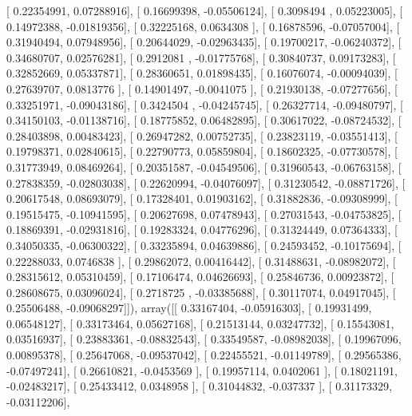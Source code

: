 \documentclass{article}
\begin{document}
       [ 0.22354991,  0.07288916],
       [ 0.16699398, -0.05506124],
       [ 0.3098494 ,  0.05223005],
       [ 0.14972388, -0.01819356],
       [ 0.32225168,  0.0634308 ],
       [ 0.16878596, -0.07057004],
       [ 0.31940494,  0.07948956],
       [ 0.20644029, -0.02963435],
       [ 0.19700217, -0.06240372],
       [ 0.34680707,  0.02576281],
       [ 0.2912081 , -0.01775768],
       [ 0.30840737,  0.09173283],
       [ 0.32852669,  0.05337871],
       [ 0.28360651,  0.01898435],
       [ 0.16076074, -0.00094039],
       [ 0.27639707,  0.0813776 ],
       [ 0.14901497, -0.0041075 ],
       [ 0.21930138, -0.07277656],
       [ 0.33251971, -0.09043186],
       [ 0.3424504 , -0.04245745],
       [ 0.26327714, -0.09480797],
       [ 0.34150103, -0.01138716],
       [ 0.18775852,  0.06482895],
       [ 0.30617022, -0.08724532],
       [ 0.28403898,  0.00483423],
       [ 0.26947282,  0.00752735],
       [ 0.23823119, -0.03551413],
       [ 0.19798371,  0.02840615],
       [ 0.22790773,  0.05859804],
       [ 0.18602325, -0.07730578],
       [ 0.31773949,  0.08469264],
       [ 0.20351587, -0.04549506],
       [ 0.31960543, -0.06763158],
       [ 0.27838359, -0.02803038],
       [ 0.22620994, -0.04076097],
       [ 0.31230542, -0.08871726],
       [ 0.20617548,  0.08693079],
       [ 0.17328401,  0.01903162],
       [ 0.31882836, -0.09308999],
       [ 0.19515475, -0.10941595],
       [ 0.20627698,  0.07478943],
       [ 0.27031543, -0.04753825],
       [ 0.18869391, -0.02931816],
       [ 0.19283324,  0.04776296],
       [ 0.31324449,  0.07364333],
       [ 0.34050335, -0.06300322],
       [ 0.33235894,  0.04639886],
       [ 0.24593452, -0.10175694],
       [ 0.22288033,  0.0746838 ],
       [ 0.29862072,  0.00416442],
       [ 0.31488631, -0.08982072],
       [ 0.28315612,  0.05310459],
       [ 0.17106474,  0.04626693],
       [ 0.25846736,  0.00923872],
       [ 0.28608675,  0.03096024],
       [ 0.2718725 , -0.03385688],
       [ 0.30117074,  0.04917045],
       [ 0.25506488, -0.09068297]]), array([[ 0.33167404, -0.05916303],
       [ 0.19931499,  0.06548127],
       [ 0.33173464,  0.05627168],
       [ 0.21513144,  0.03247732],
       [ 0.15543081,  0.03516937],
       [ 0.23883361, -0.08832543],
       [ 0.33549587, -0.08982038],
       [ 0.19967096,  0.00895378],
       [ 0.25647068, -0.09537042],
       [ 0.22455521, -0.01149789],
       [ 0.29565386, -0.07497241],
       [ 0.26610821, -0.0453569 ],
       [ 0.19957114,  0.0402061 ],
       [ 0.18021191, -0.02483217],
       [ 0.25433412,  0.0348958 ],
       [ 0.31044832, -0.037337  ],
       [ 0.31173329, -0.03112206],
\end{document}

